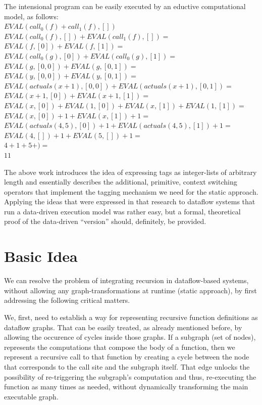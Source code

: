\documentclass[ack,preface]{dithesis}
\begin{document}
\begin{flushleft}
The intensional program can be easily executed by an eductive computational model, as follows:\\
 \setlength{\parindent}{15ex} $EVAL(call_0(f)+call_1(f), [])$ \\
$EVAL(call_0(f), []) + EVAL(call_1(f), []) =$ \\ 
$EVAL(f, [0]) + EVAL(f, [1]) =$ \\ 
$EVAL(call_0(g), [0]) + EVAL(call_0(g), [1]) =$ \\ 
$EVAL(g, [0,0]) + EVAL(g, [0,1]) =$ \\ 
$EVAL(y, [0,0]) + EVAL(y, [0,1]) =$ \\ 
$EVAL(actuals(x+1), [0,0]) + EVAL(actuals(x+1), [0,1]) =$ \\ 
$EVAL(x+1, [0]) + EVAL(x+1, [1]) =$ \\ 
$EVAL(x, [0]) + EVAL(1, [0]) + EVAL(x, [1]) + EVAL(1, [1]) =$ \\ 
$EVAL(x, [0]) + 1 + EVAL(x, [1]) + 1 =$ \\
$EVAL(actuals(4,5), [0]) + 1 + EVAL(actuals(4,5), [1]) + 1 =$ \\
$EVAL(4, []) + 1 + EVAL(5, []) + 1 =$ \\
$4+1+5+ ) =$ \\
$11$ \\
\end{flushleft}


The above work introduces the idea of expressing tags as integer-lists of arbitrary length and essentially describes the additional, primitive, context switching operators that implement the tagging mechanism we need for the static approach. Applying the ideas that were expressed in that research to dataflow systems that run a data-driven execution model was rather easy, but a formal, theoretical proof of the data-driven “version” should, definitely, be provided.

    \section{Basic Idea}
We can resolve the problem of integrating recursion in dataflow-based systems, without allowing any graph-transformations at runtime (static approach), by first addressing the following critical matters.

We, first, need to establish a way for representing recursive function definitions as dataflow graphs.  That can be easily treated, as already mentioned before, by allowing the occurence of cycles inside those graphs. If a subgraph (set of nodes), represents the computations that compose the body of a function, then we represent a recursive call to that function by creating a cycle between the node that corresponds to the call site and the subgraph itself. That edge unlocks the possibility of  re-triggering the subgraph's computation and thus, re-executing the function as many times as needed, without dynamically transforming the main executable graph.
\end{document}
